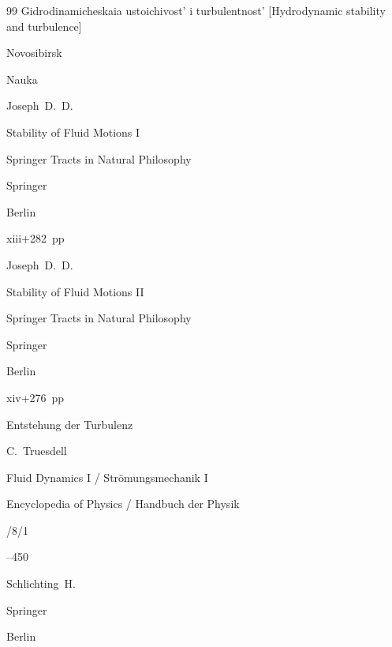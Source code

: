 \begin{thebibliography}{99}
\book Gidrodinamicheskaia ustoichivost' i turbulentnost' \rm [Hydrodynamic stability and turbulence]

\publaddr Novosibirsk

\publ Nauka








\by Joseph~D.~D.

\book Stability of Fluid Motions I


\serial Springer Tracts in Natural Philosophy


\publ Springer

\publaddr Berlin

\totalpages xiii+282~pp \nofrills


\moreref

\by Joseph~D.~D.

\book Stability of Fluid Motions II


\serial Springer Tracts in Natural Philosophy


\publ Springer

\publaddr Berlin

\totalpages xiv+276~pp \nofrills







\paper Entstehung der Turbulenz


\ed C.~Truesdell  

\inbook Fluid Dynamics I / Strömungsmechanik I

\serial  Encyclopedia of Physics / Handbuch der Physik

/8/1

--450

\by Schlichting~H. 


\publ Springer

\publaddr Berlin




\end{thebibliography}
